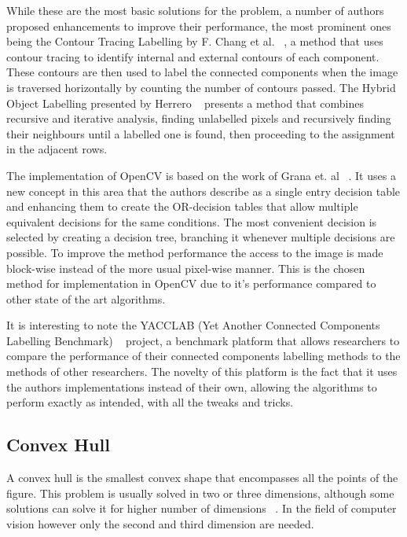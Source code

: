 While these are the most basic solutions for the problem, a number of authors proposed enhancements to improve their performance, the most prominent ones being the Contour Tracing Labelling by F. Chang et al. ~\cite{chang_linear-time_2004}, a method that uses contour tracing to identify internal and external contours of each component. These contours are then used to label the connected components when the image is traversed horizontally by counting the number of contours passed. The Hybrid Object Labelling presented by Herrero ~\cite{martin-herrero_hybrid_2007} presents a method that combines recursive and iterative analysis, finding unlabelled pixels and recursively finding their neighbours until a labelled one is found, then proceeding to the assignment in the adjacent rows.

The implementation of OpenCV is based on the work of Grana et. al ~\cite{grana_optimized_2010}. It uses a new concept in this area that the authors describe as a single entry decision table and enhancing them to create the OR-decision tables that allow multiple equivalent decisions for the same conditions. The most convenient decision is selected by creating a decision tree, branching it whenever multiple decisions are possible. To improve the method performance the access to the image is made block-wise instead of the more usual pixel-wise manner. This is the chosen method for implementation in OpenCV due to it's performance compared to other state of the art algorithms.

It is interesting to note the YACCLAB (Yet Another Connected Components Labelling Benchmark) ~\cite{grana_yacclab_2016} project, a benchmark platform that allows researchers to compare the performance of their connected components labelling methods to the methods of other researchers. The novelty of this platform is the fact that it uses the authors implementations instead of their own, allowing the algorithms to perform exactly as intended, with all the tweaks and tricks.

\subsection{Convex Hull}

A convex hull is the smallest convex shape that encompasses all the points of the figure. This problem is usually solved in two or three dimensions, although some solutions can solve it for higher number of dimensions ~\cite{chazelle_optimal_1993}. In the field of computer vision however only the second and third dimension are needed.

